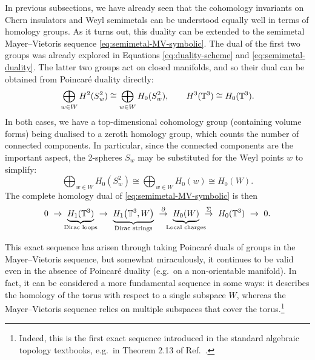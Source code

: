 In previous subsections, we have already seen that the cohomology invariants on Chern insulators and Weyl semimetals can be understood equally well in terms of homology groups. As it turns out, this duality can be extended to the semimetal Mayer--Vietoris sequence \eqref{eq:semimetal-MV-symbolic}. The dual of the first two groups was already explored in Equations \eqref{eq:duality-scheme} and \eqref{eq:semimetal-duality}. The latter two groups act on closed manifolds, and so their dual can be obtained from Poincar\'e duality directly:
\begin{equation*}
	\bigoplus_{w\in W} H^2(S_w^2) \cong \bigoplus_{w\in W} H_0(S_w^2), \qquad
	H^3(\mathbb{T}^3) \cong H_0(\mathbb{T}^3).
\end{equation*}
In both cases, we have a top-dimensional cohomology group (containing volume forms) being dualised to a zeroth homology group, which counts the number of connected components. In particular, since the connected components are the important aspect, the 2-spheres $S_w$ may be substituted for the Weyl points $w$ to simplify:
\begin{equation*}
	\bigoplus_{w\in W} H_0(S_w^2) \cong \bigoplus_{w\in W} H_0(w) \cong H_0(W).
\end{equation*}
The complete homology dual of \eqref{eq:semimetal-MV-symbolic} is then
\begin{equation}\label{eq:semimetal-homology-sequence}
	0\ \to\ \underbrace{H_1(\T^3)}_{\mathclap{\text{Dirac loops}}}\ \to\ 
	\underbrace{H_1\big(\T^3, W\big)}_{\text{Dirac strings}}\ \overset{\partial}{\to}\ \underbrace{H_0(W)}_{\mathclap{\text{Local charges}}}\ \overset{\Sigma}{\to}\ H_0(\T^3)\ \to\ 0.
\end{equation}

This exact sequence has arisen through taking Poincaré duals of groups in the Mayer--Vietoris sequence, but somewhat miraculously, it continues to be valid even in the absence of Poincaré duality (e.g.\ on a non-orientable manifold). In fact, it can be considered a more fundamental sequence in some ways: it describes the homology of the torus with respect to a single subspace $W$, whereas the Mayer--Vietoris sequence relies on multiple subspaces that cover the torus.\footnote{
	Indeed, this is the first exact sequence introduced in the standard algebraic topology textbooks, e.g.\ in Theorem 2.13 of Ref.~\cite{Hatcher_algebraic-topology}.}
	
